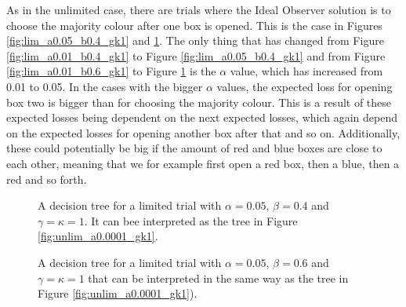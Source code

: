 As in the unlimited case, there are trials where the Ideal Observer solution is to choose the majority colour after one box is opened. This is the case in Figures \ref{fig:lim_a0.05_b0.4_gk1} and \ref{fig:lim_a0.05_b0.6_gk1}. The only thing that has changed from Figure \ref{fig:lim_a0.01_b0.4_gk1} to Figure \ref{fig:lim_a0.05_b0.4_gk1} and from Figure \ref{fig:lim_a0.01_b0.6_gk1} to Figure \ref{fig:lim_a0.05_b0.6_gk1} is the $\alpha$ value, which has increased from 0.01 to 0.05. In the cases with the bigger $\alpha$ values, the expected loss for opening box two is bigger than for choosing the majority colour. This is a result of these expected losses being dependent on the next expected losses, which again depend on the expected losses for opening another box after that and so on. Additionally, these could potentially be big if the amount of red and blue boxes are close to each other, meaning that we for example first open a red box, then a blue, then a red and so forth. 

\begin{figure}
    \centering
    \begin{minipage}[t]{0.45\textwidth} 
        \centering
        \scalebox{0.8}{}
        \caption[IO solution limited. $\alpha=0.05$, $\beta=0.4$ and $\gamma=\kappa=1$.]{A decision tree for a limited trial with $\alpha = 0.05$, $\beta=0.4$ and $\gamma=\kappa=1$. It can bee interpreted as the tree in Figure \ref{fig:unlim_a0.0001_gk1}.}
        \label{fig:lim_a0.05_b0.4_gk1}
    \end{minipage}\hfill
    \begin{minipage}[t]{0.45\textwidth} 
        \centering
        \scalebox{0.8}{}
        \caption[IO solution limited. $\alpha=0.05$, $\beta=0.6$ and $\gamma=\kappa=1$.]{A decision tree for a limited trial with $\alpha = 0.05$, $\beta=0.6$ and $\gamma=\kappa=1$ that can be interpreted in the same way as the tree in Figure \ref{fig:unlim_a0.0001_gk1}).}
        \label{fig:lim_a0.05_b0.6_gk1}
    \end{minipage}
\end{figure}


